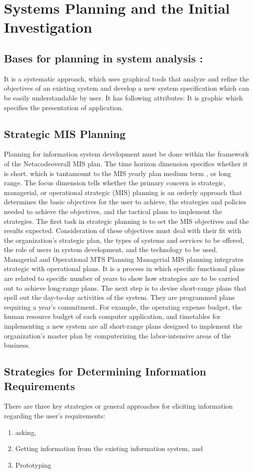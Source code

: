 \documentclass[a4paper,12pt]{report}
\begin{document}
\chapter{Systems Planning and the Initial Investigation}
\section{Bases for planning in system analysis :}
It is a systematic approach, which uses graphical tools that analyze and refine the objectives of an existing system and develop a new system specification which can be easily understandable by user. It has following attributes: It is graphic which specifies the presentation of application.
\section{Strategic MIS Planning}
Planning for information system development must be done within the framework of the Netacodeoverall MIS plan. The time horizon dimension specifics whether it is short. which is tantamount to the MIS yearly plan medium term , or long range. The focus dimension tells whether the primary concern is strategic, managerial, or operational strategic (MIS) planning is an orderly approach that determines the basic objectives for the user to achieve, the strategies and policies needed to achieve the objectives, and the tactical plans to implement the strategies. The first task in strategic planning is to set the MIS objectives and the results expected. Consideration of these objectives must deal with their fit with the organization's strategic plan, the types of systems and services to be offered, the role of users in system development, and the technology to be used. 
Managerial and Operational MTS Planning Managerial MIS planning integrates strategic with operational plans. It is a process in which specific functional plans are related to specific number of years to show how strategies are to be carried out to achieve long-range plans. The next step is to devise short-range plans that spell out the day-to-day activities of the system. They are programmed plans requiring a year's commitment. For example, the operating expense budget, the human resource budget of each computer application, and timetables for implementing a new system are all short-range plans designed to implement the organization's master plan by computerizing the labor-intensive areas of the business.
\section{Strategies for Determining Information Requirements}
There are three key strategies or general approaches for eliciting information regarding the user's requirements:
\begin{enumerate}
	\item asking, \item Getting information from the existing information system, and \item Prototyping 
\end{enumerate}
\end{document}

